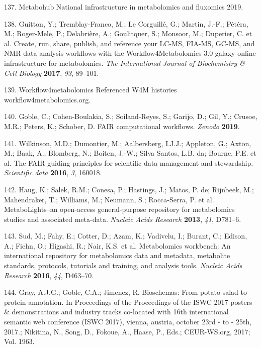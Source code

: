 \documentclass[]{article}
\begin{document}
\leavevmode\hypertarget{ref-metabohub_website_2019}{}%
137. Metabohub National infrastructure in metabolomics and fluxomics 2019.

\leavevmode\hypertarget{ref-guitton_2017}{}%
138. Guitton, Y.; Tremblay-Franco, M.; Le Corguillé, G.; Martin, J.-F.; Pétéra, M.; Roger-Mele, P.; Delabrière, A.; Goulitquer, S.; Monsoor, M.; Duperier, C. et al. Create, run, share, publish, and reference your LC-MS, FIA-MS, GC-MS, and NMR data analysis workflows with the Workflow4Metabolomics 3.0 galaxy online infrastructure for metabolomics. \emph{The International Journal of Biochemistry \& Cell Biology} \textbf{2017}, \emph{93}, 89--101.

\leavevmode\hypertarget{ref-workflow4metabolomics_website_nd}{}%
139. Workflow4metabolomics Referenced W4M histories workflow4metabolomics.org.

\leavevmode\hypertarget{ref-goble_2019}{}%
140. Goble, C.; Cohen-Boulakia, S.; Soiland-Reyes, S.; Garijo, D.; Gil, Y.; Crusoe, M.R.; Peters, K.; Schober, D. FAIR computational workflows. \emph{Zenodo} \textbf{2019}.

\leavevmode\hypertarget{ref-wilkinson_2016}{}%
141. Wilkinson, M.D.; Dumontier, M.; Aalbersberg, I.J.J.; Appleton, G.; Axton, M.; Baak, A.; Blomberg, N.; Boiten, J.-W.; Silva Santos, L.B. da; Bourne, P.E. et al. The FAIR guiding principles for scientific data management and stewardship. \emph{Scientific data} \textbf{2016}, \emph{3}, 160018.

\leavevmode\hypertarget{ref-haug_2013}{}%
142. Haug, K.; Salek, R.M.; Conesa, P.; Hastings, J.; Matos, P. de; Rijnbeek, M.; Mahendraker, T.; Williams, M.; Neumann, S.; Rocca-Serra, P. et al. MetaboLights--an open-access general-purpose repository for metabolomics studies and associated meta-data. \emph{Nucleic Acids Research} \textbf{2013}, \emph{41}, D781--6.

\leavevmode\hypertarget{ref-sud_2016}{}%
143. Sud, M.; Fahy, E.; Cotter, D.; Azam, K.; Vadivelu, I.; Burant, C.; Edison, A.; Fiehn, O.; Higashi, R.; Nair, K.S. et al. Metabolomics workbench: An international repository for metabolomics data and metadata, metabolite standards, protocols, tutorials and training, and analysis tools. \emph{Nucleic Acids Research} \textbf{2016}, \emph{44}, D463--70.

\leavevmode\hypertarget{ref-gray_2017}{}%
144. Gray, A.J.G.; Goble, C.A.; Jimenez, R. Bioschemas: From potato salad to protein annotation. In Proceedings of the Proceedings of the ISWC 2017 posters \& demonstrations and industry tracks co-located with 16th international semantic web conference (ISWC 2017), vienna, austria, october 23rd - to - 25th, 2017.; Nikitina, N., Song, D., Fokoue, A., Haase, P., Eds.; CEUR-WS.org, 2017; Vol. 1963.
\end{document}
